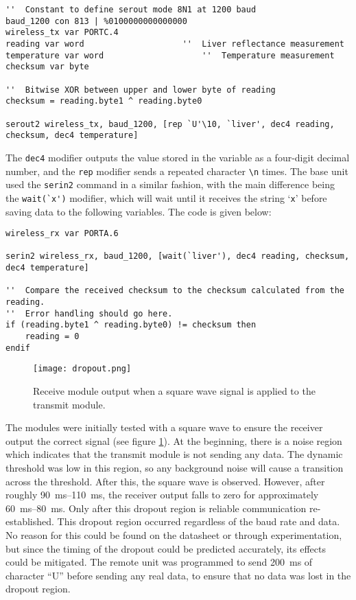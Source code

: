 \begin{lstlisting}
''  Constant to define serout mode 8N1 at 1200 baud
baud_1200 con 813 | %0100000000000000
wireless_tx var PORTC.4
reading var word 					''  Liver reflectance measurement
temperature var word					''  Temperature measurement
checksum var byte

''  Bitwise XOR between upper and lower byte of reading
checksum = reading.byte1 ^ reading.byte0

serout2 wireless_tx, baud_1200, [rep `U'\10, `liver', dec4 reading, checksum, dec4 temperature]
\end{lstlisting}

The \verb|dec4| modifier outputs the value stored in the variable as a four-digit decimal number, and the \verb|rep| modifier sends a repeated character \verb|\n| times. The base unit used the \verb|serin2| command in a similar fashion, with the main difference being the \verb|wait(`x')| modifier, which will wait until it receives the string `\verb|x|' before saving data to the following variables. The code is given below:

\begin{lstlisting}
wireless_rx var PORTA.6

serin2 wireless_rx, baud_1200, [wait(`liver'), dec4 reading, checksum, dec4 temperature]

''  Compare the received checksum to the checksum calculated from the reading. 
''  Error handling should go here.
if (reading.byte1 ^ reading.byte0) != checksum then
    reading = 0
endif
\end{lstlisting}






\begin{figure}[htb]
	\centering
	\texttt{[image: dropout.png]}
	\caption{Receive module output when a square wave signal is applied to the transmit module.}
	\label{fig: dropout}
\end{figure}

The modules were initially tested with a square wave to ensure the receiver output the correct signal (see figure \ref{fig: dropout}). At the beginning, there is a noise region which indicates that the transmit module is not sending any data. The dynamic threshold was low in this region, so any background noise will cause a transition across the threshold. After this, the square wave is observed. However, after roughly \SIrange{90}{110}{\milli\second}, the receiver output falls to zero for approximately \SIrange{60}{80}{\milli\second}. Only after this dropout region is reliable communication re-established. This dropout region occurred regardless of the baud rate and data. No reason for this could be found on the datasheet or through experimentation, but since the timing of the dropout could be predicted accurately, its effects could be mitigated. The remote unit was programmed to send \SI{200}{\milli\second} of character ``U'' before sending any real data, to ensure that no data was lost in the dropout region.\\

